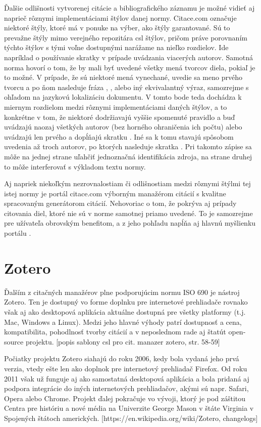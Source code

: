 \documentclass{fithesis3}
\begin{document}
	Ďalšie odlišnosti vytvorenej citácie a bibliografického záznamu je možné vidieť aj naprieč rôznymi implementáciami štýlov danej normy. Citace.com označuje niektoré štýly, ktoré má v ponuke na výber, ako štýly garantované. Sú to prevažne štýly mimo verejného repozitára csl štýlov, pričom práve porovnaním týchto štýlov s tými voľne dostupnými narážame na nieľko rozdielov. Ide napríklad o používanie skratky  v prípade uvádzania viacerých autorov. Samotná norma hovorí o tom, že by mali byť uvedené všetky mená tvorcov diela, pokiaľ je to možné. V prípade, že sú niektoré mená vynechané, uvedie sa meno prvého tvorcu a po ňom nasleduje fráza , ,  alebo iný ekvivalantný výraz, samozrejme s ohľadom na jazykovú lokalizáciu dokumentu. V tomto bode teda dochádza k miernym rozdielom medzi rôznymi implementáciami daných štýlov, a to konkrétne v tom, že niektoré dodržiavajú vyššie spomenuté pravidlo a buď uvádzajú naozaj všetkých autorov (bez horného ohraničenia ich počtu) alebo uvádzajú len prvého a dopĺňajú skratku . Iné sa k tomu stavajú spôsobom uvedenia až troch autorov, po ktorých nasleduje skratka . Pri takomto zápise sa môže na jednej strane uľahčiť jednoznačná identifikácia zdroja, na strane druhej to môže interferovať s výkladom textu normy.
	
	Aj napriek niekoľkým nezrovnalostiam či odlišnostiam medzi rôznymi štýlmi tej istej normy je portál citace.com výborným manažérom citácií s kvalitne spracovaným generátorom citácií. Nehovoriac o tom, že pokrýva aj prípady citovania diel, ktoré nie sú v norme samotnej priamo uvedené. To je samozrejme pre užívateľa obrovským benefitom, a z jeho pohľadu napĺňa aj hlavnú myšlienku portálu .
	
	\section{Zotero}
	Ďalším z citačných manažérov plne podporujúcim normu ISO 690 je nástroj Zotero. Ten je dostupný vo forme doplnku pre internetové prehliadače rovnako však aj ako desktopová aplikácia aktuálne dostupná pre všetky platformy (t.j. Mac, Windows a Linux). Medzi jeho hlavné výhody patrí dostupnosť a cena, kompatibilita, pohodlnosť tvorby citácií a v neposlednom rade aj štatút open-source projektu. [popis sablony csl pro cit. manazer zotero, str. 58-59]
	
	Počiatky projektu Zotero siahajú do roku 2006, kedy bola vydaná jeho prvá verzia, vtedy ešte len ako doplnok pre internetový prehliadač Firefox. Od roku 2011 však už funguje aj ako samostatná desktopová aplikácia a bola pridaná aj podpora integrácie do iných internetových prehliadačov, akými sú napr. Safari, Opera alebo Chrome. Projekt ďalej pokračuje vo vývoji, ktorý je pod záštitou Centra pre históriu a nové média na Univerzite George Mason v štáte Virginia v Spojených štátoch amerických. [https://en.wikipedia.org/wiki/Zotero, changelogs]
	
\end{document}
